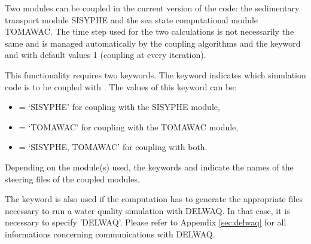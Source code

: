 Two modules can be coupled in the current version of the code: the sedimentary
transport module SISYPHE and the sea state computational module TOMAWAC. The
time step used for the two calculations is not necessarily the same and is
managed automatically by the coupling algorithms and the keyword
 and 
with default values 1 (coupling at every iteration).

This functionality requires two keywords. The keyword 
indicates which simulation code is to be coupled with . The values of
this keyword can be:

\begin{itemize}
\item  {}= `SISYPHE' for coupling with the SISYPHE module,

\item  {}= `TOMAWAC' for coupling with the TOMAWAC module,

\item  {}= `SISYPHE, TOMAWAC' for coupling with both.
\end{itemize}

Depending on the module(s) used, the keywords and indicate the names of the steering files
of the coupled modules.

The keyword  is also used if the computation has to
generate the appropriate files necessary to run a water quality simulation with
DELWAQ. In that case, it is necessary to specify 'DELWAQ'. Please refer to Appendix \ref{sec:delwaq} for all informations
concerning communications with DELWAQ.

